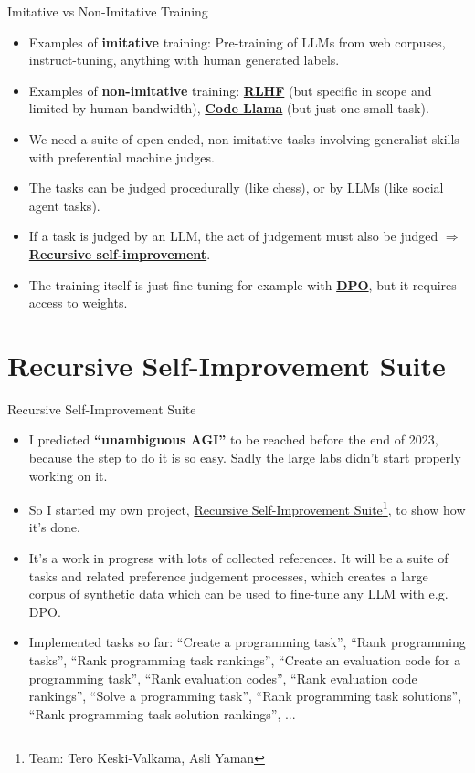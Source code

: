 \documentclass{beamer}
\begin{document}
\begin{frame}{Imitative vs Non-Imitative Training}
  \begin{itemize}
   \item Examples of \textbf{imitative} training: Pre-training of LLMs from web corpuses, instruct-tuning, anything with human generated labels.
   \item Examples of \textbf{non-imitative} training: \textcolor{blue}{\href{https://arxiv.org/abs/1909.08593}{\textbf{RLHF}}} (but specific in scope and limited by human bandwidth), \textcolor{blue}{\href{https://about.fb.com/news/2023/08/code-llama-ai-for-coding/}{\textbf{Code Llama}}} (but just one small task).
   \item We need a suite of open-ended, non-imitative tasks involving generalist skills with preferential machine judges.
   \item The tasks can be judged procedurally (like chess), or by LLMs (like social agent tasks).
   \item If a task is judged by an LLM, the act of judgement must also be judged $\Rightarrow$ \textcolor{blue}{\href{https://github.com/keskival/recursive-self-improvement-suite}{\textbf{Recursive self-improvement}}}.
   \item The training itself is just fine-tuning for example with \textcolor{blue}{\href{https://arxiv.org/abs/2305.18290}{\textbf{DPO}}}, but it requires access to weights.
  \end{itemize}

\end{frame}

\section{Recursive Self-Improvement Suite}
\begin{frame}{Recursive Self-Improvement Suite}
  \begin{itemize}
   \item I predicted \textbf{``unambiguous AGI''} to be reached before the end of 2023, because the step to do it is so easy. Sadly the large labs didn't start properly working on it.
   \item So I started my own project, \textcolor{blue}{\href{https://github.com/keskival/recursive-self-improvement-suite}{Recursive Self-Improvement Suite}}\footnote{Team: Tero Keski-Valkama, Asli Yaman}, to show how it's done.
   \item It's a work in progress with lots of collected references. It will be a suite of tasks and related preference judgement processes, which creates a large corpus of synthetic data which can be used to fine-tune any LLM with e.g. DPO.
   \item Implemented tasks so far: ``Create a programming task'', ``Rank programming tasks'', ``Rank programming task rankings'', ``Create an evaluation code for a programming task'', ``Rank evaluation codes'', ``Rank evaluation code rankings'', ``Solve a programming task'', ``Rank programming task solutions'', ``Rank programming task solution rankings'', ...
  \end{itemize}
\end{frame}
\end{document}
